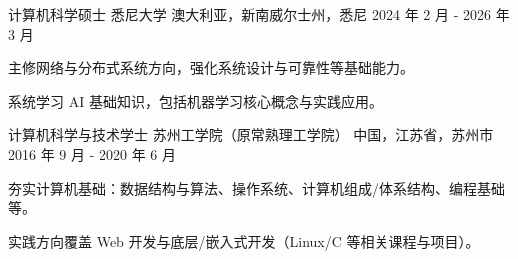 

\begin{cventries}

  \cventry
    {计算机科学硕士} %
    {悉尼大学} %
    {澳大利亚，新南威尔士州，悉尼} %
    {2024 年 2 月 - 2026 年 3 月} %
    {
      \begin{cvitems} %
        \item {主修网络与分布式系统方向，强化系统设计与可靠性等基础能力。}
        \item {系统学习 AI 基础知识，包括机器学习核心概念与实践应用。}
      \end{cvitems}
    }

  \cventry
    {计算机科学与技术学士} %
    {苏州工学院（原常熟理工学院）} %
    {中国，江苏省，苏州市} %
    {2016 年 9 月 - 2020 年 6 月} %
    {
      \begin{cvitems} %
        \item {夯实计算机基础：数据结构与算法、操作系统、计算机组成/体系结构、编程基础等。}
        \item {实践方向覆盖 Web 开发与底层/嵌入式开发（Linux/C 等相关课程与项目）。}
      \end{cvitems}
    }

\end{cventries}
